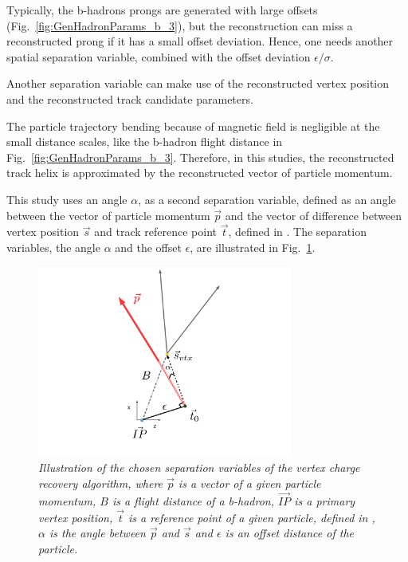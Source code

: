 Typically, the b-hadrons prongs are generated with large offsets (Fig.~\ref{fig:GenHadronParams_b_3}), but the reconstruction can miss a reconstructed prong if it has a small offset deviation. 
Hence, one needs another spatial separation variable, combined with the offset deviation $\epsilon/\sigma$. 

Another separation variable can make use of the reconstructed vertex position and the reconstructed track candidate parameters. 

The particle trajectory bending because of magnetic field is negligible at the small distance scales, like the b-hadron flight distance in Fig.~\ref{fig:GenHadronParams_b_3}. 
Therefore, in this studies, the reconstructed track helix is approximated by the reconstructed vector of particle momentum. 

This study uses an angle $\alpha$, as a second separation variable, defined as an angle between the vector of particle momentum $\vec{p}$ and the vector of difference between vertex position $\vec{s}$ and track reference point $\vec{t}$, defined in \cite{bib:LCIOtrack}. The separation variables, the angle $\alpha$ and the offset $\epsilon$, are illustrated in Fig.~\ref{fig:VtxRecovery_3}.

\begin{figure}
{\centering
    \includegraphics[width=0.75\textwidth]{ILD/plots/recovery-graph.pdf}
    \caption{\sl Illustration of the chosen separation variables of the vertex charge recovery algorithm, where $\vec{p}$ is a vector of a given particle momentum, $B$ is a flight distance of a b-hadron, $\vec{IP}$ is a primary vertex position, $\vec{t}$ is a reference point of a given particle, defined in \cite{bib:LCIOtrack}, $\alpha$ is the angle between $\vec{p}$ and $\vec{s}$ and $\epsilon$ is an offset distance of the particle. %
    }
    \label{fig:VtxRecovery_3}
  }
\end{figure}

